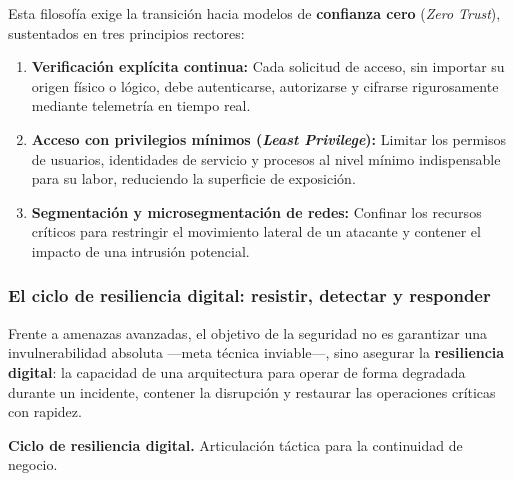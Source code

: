 Esta filosofía exige la transición hacia modelos de \textbf{confianza cero} (\textit{Zero Trust}), sustentados en tres principios rectores:
\begin{enumerate}
  \item \textbf{Verificación explícita continua:} Cada solicitud de acceso, sin importar su origen físico o lógico, debe autenticarse, autorizarse y cifrarse rigurosamente mediante telemetría en tiempo real.
  \item \textbf{Acceso con privilegios mínimos (\textit{Least Privilege}):} Limitar los permisos de usuarios, identidades de servicio y procesos al nivel mínimo indispensable para su labor, reduciendo la superficie de exposición.
  \item \textbf{Segmentación y microsegmentación de redes:} Confinar los recursos críticos para restringir el movimiento lateral de un atacante y contener el impacto de una intrusión potencial.
\end{enumerate}

\clearpage
\subsubsection*{\textcolor{unabblue}{}\quad El ciclo de resiliencia digital: resistir, detectar y responder}
Frente a amenazas avanzadas, el objetivo de la seguridad no es garantizar una invulnerabilidad absoluta —meta técnica inviable—, sino asegurar la \textbf{resiliencia digital}: la capacidad de una arquitectura para operar de forma degradada durante un incidente, contener la disrupción y restaurar las operaciones críticas con rapidez.

\begin{center}

{\small\textbf{Ciclo de resiliencia digital.} Articulación táctica para la continuidad de negocio.\par}
\end{center}

